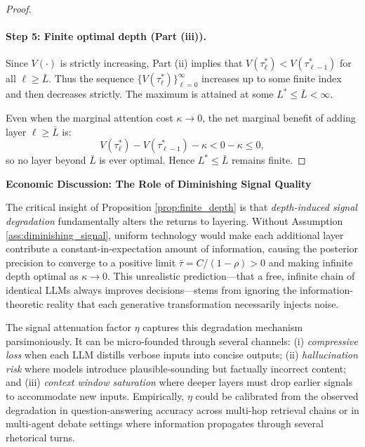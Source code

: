 \begin{proof}
\paragraph{Step 5: Finite optimal depth (Part (iii)).}
Since $V(\cdot)$ is strictly increasing, Part (ii) implies that $V(\tau^{*}_{\ell}) < V(\tau^{*}_{\ell-1})$ for all $\ell \geq \bar{L}$. Thus the sequence $\{V(\tau^{*}_{\ell})\}_{\ell=0}^{\infty}$ increases up to some finite index and then decreases strictly. The maximum is attained at some $L^{*} \leq \bar{L} < \infty$.

Even when the marginal attention cost $\kappa \to 0$, the net marginal benefit of adding layer $\ell \geq \bar{L}$ is:
\begin{equation}
V(\tau^{*}_{\ell}) - V(\tau^{*}_{\ell-1}) - \kappa < 0 - \kappa \leq 0,
\end{equation}
so no layer beyond $\bar{L}$ is ever optimal. Hence $L^{*} \leq \bar{L}$ remains finite.
\end{proof}


\vspace{2em}
\noindent\textbf{Economic Discussion: The Role of Diminishing Signal Quality}

The critical insight of Proposition \ref{prop:finite_depth} is that \emph{depth-induced signal degradation} fundamentally alters the returns to layering. Without Assumption \ref{ass:diminishing_signal}, uniform technology would make each additional layer contribute a constant-in-expectation amount of information, causing the posterior precision to converge to a positive limit $\bar{\tau} = C/(1-\rho) > 0$ and making infinite depth optimal as $\kappa \to 0$. This unrealistic prediction---that a free, infinite chain of identical LLMs always improves decisions---stems from ignoring the information-theoretic reality that each generative transformation necessarily injects noise.

The signal attenuation factor $\eta$ captures this degradation mechanism parsimoniously. It can be micro-founded through several channels: (i) \emph{compressive loss} when each LLM distills verbose inputs into concise outputs; (ii) \emph{hallucination risk} where models introduce plausible-sounding but factually incorrect content; and (iii) \emph{context window saturation} where deeper layers must drop earlier signals to accommodate new inputs. Empirically, $\eta$ could be calibrated from the observed degradation in question-answering accuracy across multi-hop retrieval chains or in multi-agent debate settings where information propagates through several rhetorical turns.

